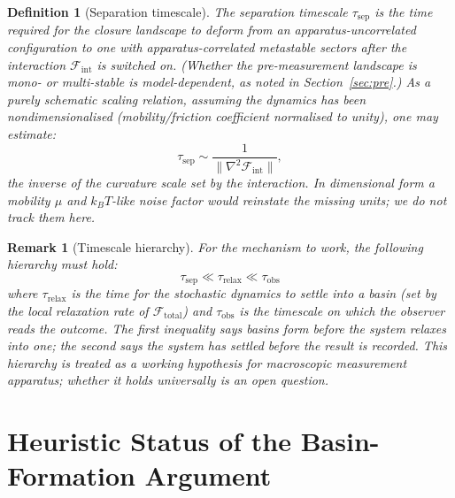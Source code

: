 \documentclass[12pt]{article}
\newtheorem{definition}[theorem]{Definition}
\newtheorem{remark}[theorem]{Remark}
\newcommand{\Fcal}{\mathcal{F}}
\begin{document}
\begin{definition}[Separation timescale]\label{def:timescale}
The \textit{separation timescale} $\tau_{\mathrm{sep}}$ is the time required for the closure landscape to deform from an apparatus-uncorrelated configuration to one with apparatus-correlated metastable sectors after the interaction $\Fcal_{\mathrm{int}}$ is switched on. (Whether the pre-measurement landscape is mono- or multi-stable is model-dependent, as noted in Section~\ref{sec:pre}.) As a purely schematic scaling relation, assuming the dynamics has been nondimensionalised (mobility/friction coefficient normalised to unity), one may estimate:
\begin{equation}\label{eq:timescale}
    \tau_{\mathrm{sep}} \sim \frac{1}{\|\nabla^2 \Fcal_{\mathrm{int}}\|},
\end{equation}
the inverse of the curvature scale set by the interaction. In dimensional form a mobility $\mu$ and $k_B T$-like noise factor would reinstate the missing units; we do not track them here.
\end{definition}

\begin{remark}[Timescale hierarchy]
For the mechanism to work, the following hierarchy must hold:
\begin{equation}\label{eq:hierarchy}
    \tau_{\mathrm{sep}} \ll \tau_{\mathrm{relax}} \ll \tau_{\mathrm{obs}}
\end{equation}
where $\tau_{\mathrm{relax}}$ is the time for the stochastic dynamics to settle into a basin (set by the local relaxation rate of $\Fcal_{\mathrm{total}}$) and $\tau_{\mathrm{obs}}$ is the timescale on which the observer reads the outcome. The first inequality says basins form before the system relaxes into one; the second says the system has settled before the result is recorded. This hierarchy is treated as a working hypothesis for macroscopic measurement apparatus; whether it holds universally is an open question.
\end{remark}

\section{Heuristic Status of the Basin-Formation Argument}\label{sec:heuristic}
\end{document}
